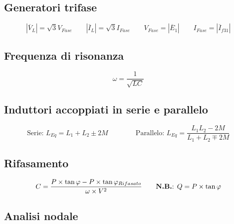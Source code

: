 \documentclass[10pt]{article}
\begin{document}
    \hspace{-.65cm}
    \begin{minipage}[t]{.5\textwidth}
        \subsection*{Generatori trifase}
    
            \[
                |\overline{V}_L| = \sqrt{3} V_{Fase} \qquad |\overline{I}_L| = \sqrt{3} I_{Fase} \qquad V_{Fase} = |\overline{E}_1| \qquad I_{Fase} = |\overline{I}_{f31}|
            \]
    \end{minipage}
    \hfill
    \begin{minipage}[t]{.4\textwidth}
        \subsection*{Frequenza di risonanza}

            \[
                \omega = \frac{1}{\sqrt{LC}}
            \]
    \end{minipage}

    \hspace{-.65cm}
    \begin{minipage}[t]{.45\textwidth}
        \subsection*{Induttori accoppiati in serie e parallelo}
    
            \[
                \text{Serie: } L_{Eq} = L_1 + L_2 \pm 2M \qquad\qquad \text{Parallelo: } L_{Eq} = \frac{L_1 L_2 - 2M}{L_1 + L_2 \mp 2M}
            \]
    \end{minipage}
    \hfill
    \begin{minipage}[t]{.45\textwidth}
        \subsection*{Rifasamento}

            \[
                C = \frac{P \times \tan \varphi - P \times \tan \varphi_{Rifasato}}{\omega \times V^2} \qquad \text{\textbf{N.B.}: }Q = P \times \tan \varphi
            \]
    \end{minipage}

    \newpage

    \subsection*{Analisi nodale}
    \vspace{-1.5\baselineskip}
\end{document}
